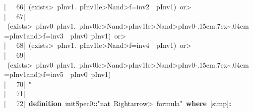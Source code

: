 \documentclass{article}
\newcommand{\syntaxKEYWORDA}[1]{\textcolor[rgb]{0.0,0.4,0.6}{\textbf{#1}}}
\newcommand{\syntaxKEYWORDB}[1]{\textcolor[rgb]{0.0,0.6,0.4}{\textbf{#1}}}
\newcommand{\syntaxLITERALA}[1]{\textcolor[rgb]{1.0,0.0,0.8}{#1}}
\newcommand{\syntaxOPERATOR}[1]{\textcolor[rgb]{0.0,0.0,0.0}{\textbf{#1}}}
\newcommand{\syntaxKEYWORDA}[1]{\textcolor[rgb]{0.0,0.4,0.6}{\textbf{#1}}}
\newcommand{\syntaxKEYWORDB}[1]{\textcolor[rgb]{0.0,0.6,0.4}{\textbf{#1}}}
\newcommand{\syntaxLITERALA}[1]{\textcolor[rgb]{1.0,0.0,0.8}{#1}}
\newcommand{\syntaxOPERATOR}[1]{\textcolor[rgb]{0.0,0.0,0.0}{\textbf{#1}}}
\newcommand{\syntaxKEYWORDA}[1]{\textcolor[rgb]{0.0,0.4,0.6}{\textbf{#1}}}
\newcommand{\syntaxKEYWORDB}[1]{\textcolor[rgb]{0.0,0.6,0.4}{\textbf{#1}}}
\newcommand{\syntaxLITERALA}[1]{\textcolor[rgb]{1.0,0.0,0.8}{#1}}
\newcommand{\syntaxOPERATOR}[1]{\textcolor[rgb]{0.0,0.0,0.0}{\textbf{#1}}}
\newcommand{\syntaxKEYWORDA}[1]{\textcolor[rgb]{0.0,0.4,0.6}{#1}}
\newcommand{\syntaxKEYWORDB}[1]{\textcolor[rgb]{0.0,0.6,0.4}{#1}}
\newcommand{\syntaxLITERALA}[1]{\textcolor[rgb]{1.0,0.0,0.8}{\textbf{#1}}}
\newcommand{\syntaxOPERATOR}[1]{\textcolor[rgb]{0.0,0.0,0.0}{#1}}
\newcommand{\syntaxKEYWORDA}[1]{\textcolor[rgb]{0.0,0.4,0.6}{#1}}
\newcommand{\syntaxKEYWORDB}[1]{\textcolor[rgb]{0.0,0.6,0.4}{#1}}
\newcommand{\syntaxLITERALA}[1]{\textcolor[rgb]{1.0,0.0,0.8}{#1}}
\newcommand{\syntaxOPERATOR}[1]{\textcolor[rgb]{0.0,0.0,0.0}{#1}}
\newcommand{\syntaxKEYWORDA}[1]{\textcolor[rgb]{0.0,0.4,0.6}{\textbf{#1}}}
\newcommand{\syntaxKEYWORDB}[1]{\textcolor[rgb]{0.0,0.6,0.4}{\textbf{#1}}}
\newcommand{\syntaxLITERALA}[1]{\textcolor[rgb]{1.0,0.0,0.8}{#1}}
\newcommand{\syntaxOPERATOR}[1]{\textcolor[rgb]{0.0,0.0,0.0}{\textbf{#1}}}
\newcommand{\gutter}[1]{\textcolor[rgb]{0,0,0}{{|}#1}}
\newcommand{\gutterH}[1]{\textcolor[rgb]{1,0,0}{{|}#1}}
\def\urltilda{\kern -.15em\lower .7ex\hbox{\~{}}\kern .04em}
\begin{document}
\gutter{\ \ \ 66{|}\ }\syntaxLITERALA{(\<exists>{\ }p\usebox{\underscorebox}\usebox{\underscorebox}Inv1.{\ }p\usebox{\underscorebox}\usebox{\underscorebox}Inv1\<le>N\<and>f=inv\usebox{\underscorebox}\usebox{\underscorebox}2{\ }{\ }p\usebox{\underscorebox}\usebox{\underscorebox}Inv1){\ }\<or>}\hspace*{\fill}\\
\gutter{\ \ \ 67{|}\ }\syntaxLITERALA{(\<exists>{\ }p\usebox{\underscorebox}\usebox{\underscorebox}Inv0{\ }p\usebox{\underscorebox}\usebox{\underscorebox}Inv1.{\ }p\usebox{\underscorebox}\usebox{\underscorebox}Inv0\<le>N\<and>p\usebox{\underscorebox}\usebox{\underscorebox}Inv1\<le>N\<and>p\usebox{\underscorebox}\usebox{\underscorebox}Inv0\urltilda=p\usebox{\underscorebox}\usebox{\underscorebox}Inv1\<and>f=inv\usebox{\underscorebox}\usebox{\underscorebox}3{\ }{\ }p\usebox{\underscorebox}\usebox{\underscorebox}Inv0{\ }p\usebox{\underscorebox}\usebox{\underscorebox}Inv1){\ }\<or>}\hspace*{\fill}\\
\gutter{\ \ \ 68{|}\ }\syntaxLITERALA{(\<exists>{\ }p\usebox{\underscorebox}\usebox{\underscorebox}Inv1.{\ }p\usebox{\underscorebox}\usebox{\underscorebox}Inv1\<le>N\<and>f=inv\usebox{\underscorebox}\usebox{\underscorebox}4{\ }{\ }p\usebox{\underscorebox}\usebox{\underscorebox}Inv1){\ }\<or>}\hspace*{\fill}\\
\gutter{\ \ \ 69{|}\ }\syntaxLITERALA{(\<exists>{\ }p\usebox{\underscorebox}\usebox{\underscorebox}Inv0{\ }p\usebox{\underscorebox}\usebox{\underscorebox}Inv1.{\ }p\usebox{\underscorebox}\usebox{\underscorebox}Inv0\<le>N\<and>p\usebox{\underscorebox}\usebox{\underscorebox}Inv1\<le>N\<and>p\usebox{\underscorebox}\usebox{\underscorebox}Inv0\urltilda=p\usebox{\underscorebox}\usebox{\underscorebox}Inv1\<and>f=inv\usebox{\underscorebox}\usebox{\underscorebox}5{\ }{\ }p\usebox{\underscorebox}\usebox{\underscorebox}Inv0{\ }p\usebox{\underscorebox}\usebox{\underscorebox}Inv1)}\hspace*{\fill}\\
\gutterH{\ \ \ 70{|}\ }\syntaxLITERALA{\usebox{\closecurlybracket}"}\hspace*{\fill}\\
\gutter{\ \ \ 71{|}\ }\hspace*{\fill}\\
\gutter{\ \ \ 72{|}\ }\syntaxKEYWORDA{definition}{\ }initSpec0\syntaxOPERATOR{::}\syntaxLITERALA{"nat{\ }\<Rightarrow>{\ }formula"}{\ }\syntaxKEYWORDB{where}{\ }\syntaxOPERATOR{{[}}simp\syntaxOPERATOR{{]}}\syntaxOPERATOR{:}\hspace*{\fill}\\
\end{document}
